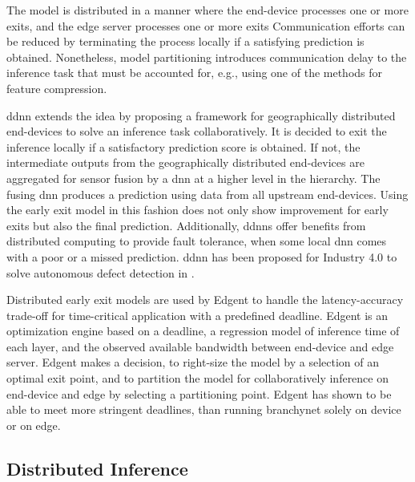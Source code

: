 \begin{enumdescript}
	The model is distributed in a manner where the end-device processes one or more exits, and the edge server processes one or more exits Communication efforts can be reduced by terminating the process locally if a satisfying prediction is obtained. Nonetheless, model partitioning introduces communication delay to the inference task that must be accounted for, e.g., using one of the methods for feature compression.
	
	\gls{ddnn} \cite{teerapittayanon_distributed_2017} extends the idea by proposing a framework for geographically distributed end-devices to solve an inference task collaboratively. It is decided to exit the inference locally if a satisfactory prediction score is obtained. If not, the intermediate outputs from the geographically distributed end-devices are aggregated for sensor fusion by a \gls{dnn} at a higher level in the hierarchy. The fusing \gls{dnn} produces a prediction using data from all upstream end-devices. Using the early exit model in this fashion does not only show improvement for early exits but also the final prediction. Additionally, \gls{ddnn}s offer benefits from distributed computing to provide fault tolerance, when some local \gls{dnn} comes with a poor or a missed prediction. \gls{ddnn} has been proposed for Industry 4.0 to solve autonomous defect detection in \cite{li_deep_2018}. 
	
	Distributed early exit models are used by Edgent \cite{li_edge_2018} to handle the latency-accuracy trade-off for time-critical application with a predefined deadline. Edgent is an optimization engine based on a deadline, a regression model of inference time of each layer, and the observed available bandwidth between end-device and edge server. Edgent makes a decision, to right-size the model by a selection of an optimal exit point, and to partition the model for collaboratively inference on end-device and edge by selecting a partitioning point. Edgent has shown to be able to meet more stringent deadlines, than running \gls{branchynet} solely on device or on edge.
\end{enumdescript}

\subsection{Distributed Inference}

